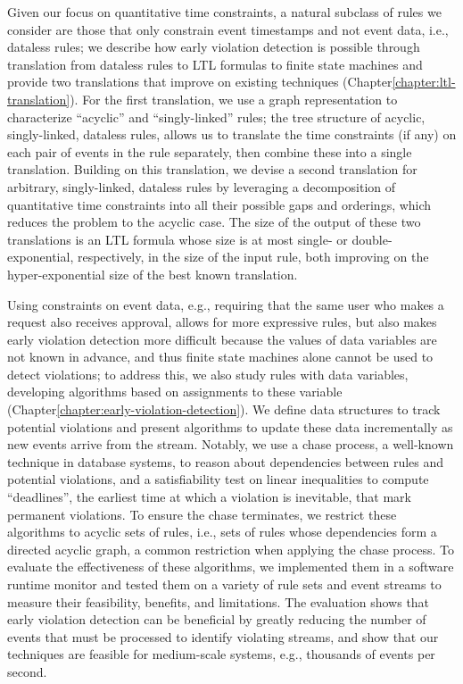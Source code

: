 Given our focus on quantitative time constraints,
a natural subclass of rules we consider
are those that only constrain event timestamps
and not event data, i.e., dataless rules;
we describe how early violation detection is possible
through translation from dataless rules to LTL formulas to finite state machines
and provide two translations that improve on existing techniques (Chapter\:\ref{chapter:ltl-translation}).
For the first translation,
we use a graph representation to characterize ``acyclic'' and ``singly-linked'' rules;
the tree structure of acyclic, singly-linked, dataless rules,
allows us to translate the time constraints (if any) on each pair of events in the rule separately,
then combine these into a single translation.
Building on this translation,
we devise a second translation for arbitrary, singly-linked, dataless rules
by leveraging a decomposition of quantitative time constraints into all their possible gaps and orderings,
which reduces the problem to the acyclic case.
The size of the output of these two translations is an LTL formula
whose size is at most single- or double-exponential, respectively, in the size of the input rule,
both improving on the hyper-exponential size of the best known translation.

Using constraints on event data,
e.g., requiring that the same user who makes a request also receives approval,
allows for more expressive rules,
but also makes early violation detection more difficult
because the values of data variables are not known in advance,
and thus
finite state machines alone cannot be used to detect violations;
to address this, we also study rules with data variables,
developing algorithms
based on assignments to these variable
(Chapter\:\ref{chapter:early-violation-detection}).
We define data structures to track potential violations
and present algorithms to update these data incrementally
as new events arrive from the stream.
Notably, we use a chase process,
a well-known technique in database systems,
to reason about dependencies between rules and potential violations,
and
a satisfiability test on linear inequalities
to compute ``deadlines'',
the earliest time at which a violation is inevitable,
that mark permanent violations.
To ensure the chase terminates,
we restrict these algorithms to acyclic sets of rules,
i.e., sets of rules whose dependencies form a directed acyclic graph,
a common restriction when applying the chase process.
To evaluate the effectiveness of these algorithms,
we implemented them in a software runtime monitor
and tested them on a variety of rule sets and event streams
to measure their feasibility, benefits, and limitations.
The evaluation shows that early violation detection can be beneficial
by greatly reducing the number of events that must be processed
to identify violating streams,
and show that our techniques are feasible for medium-scale systems,
e.g., thousands of events per second.

